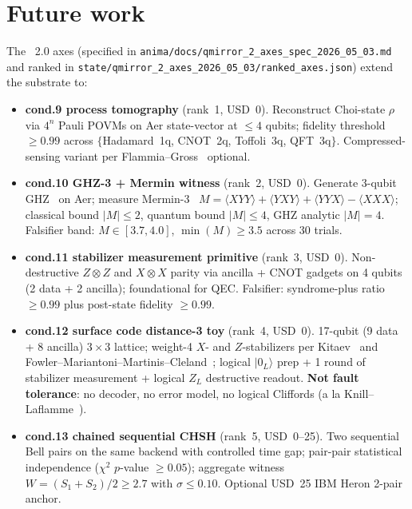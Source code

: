 \section{Future work}\label{sec:future}

The \qmirror{}~2.0 axes (specified in
\texttt{anima/docs/qmirror\_2\_axes\_spec\_2026\_05\_03.md} and ranked
in \texttt{state/qmirror\_2\_axes\_2026\_05\_03/ranked\_axes.json})
extend the substrate to:

\begin{itemize}
\item \textbf{cond.9 process tomography} (rank~1, USD~0). Reconstruct
  Choi-state $\rho$ via $4^{n}$ Pauli POVMs on Aer state-vector at
  $\le 4$ qubits; fidelity threshold $\ge 0.99$ across
  $\{$Hadamard~1q, CNOT~2q, Toffoli~3q, QFT~3q$\}$. Compressed-sensing
  variant per Flammia--Gross~\cite{Flammia-Gross-2012} optional.
\item \textbf{cond.10 GHZ-3 + Mermin witness} (rank~2, USD~0).
  Generate 3-qubit GHZ~\cite{GHZ-1989} on Aer; measure
  Mermin-3~\cite{Mermin-1990}
  $M = \langle XYY\rangle + \langle YXY\rangle + \langle YYX\rangle
   - \langle XXX\rangle$;
  classical bound $\lvert M\rvert \le 2$, quantum bound
  $\lvert M\rvert \le 4$, GHZ analytic $\lvert M\rvert = 4$.
  Falsifier band: $M \in [3.7, 4.0]$, $\min(M) \ge 3.5$ across
  30 trials.
\item \textbf{cond.11 stabilizer measurement primitive} (rank~3,
  USD~0). Non-destructive $Z\!\otimes\!Z$ and $X\!\otimes\!X$ parity
  via ancilla + CNOT gadgets on 4 qubits (2 data + 2 ancilla);
  foundational for QEC. Falsifier: syndrome-plus ratio $\ge 0.99$
  plus post-state fidelity $\ge 0.99$.
\item \textbf{cond.12 surface code distance-3 toy} (rank~4, USD~0).
  17-qubit (9 data + 8 ancilla) $3 \times 3$ lattice; weight-4 $X$-
  and $Z$-stabilizers per Kitaev~\cite{Kitaev-2003} and
  Fowler--Mariantoni--Martinis--Cleland~\cite{Surface-Code-2012};
  logical $|0_{L}\rangle$ prep + 1 round of stabilizer measurement
  + logical $Z_{L}$ destructive readout. \textbf{Not fault tolerance}:
  no decoder, no error model, no logical Cliffords (a la
  Knill--Laflamme~\cite{Knill-Laflamme-1998}).
\item \textbf{cond.13 chained sequential CHSH} (rank~5, USD~0--25).
  Two sequential Bell pairs on the same backend with controlled time
  gap; pair-pair statistical independence ($\chi^{2}$ $p$-value
  $\ge 0.05$); aggregate witness $W = (S_{1} + S_{2})/2 \ge 2.7$ with
  $\sigma \le 0.10$. Optional USD~25 IBM Heron 2-pair anchor.
\end{itemize}


